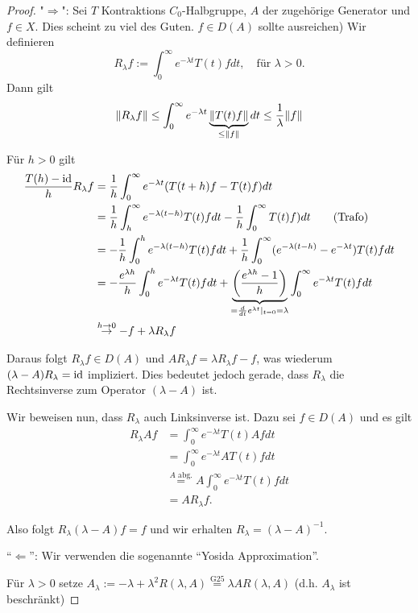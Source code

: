 \begin{proof}
"$\Rightarrow$": 
Sei $T$ Kontraktions $C_0$-Halbgruppe, $A$ der zugehörige Generator und $f \in X$. {\tiny{Dies scheint zu viel des Guten. $f \in D(A)$ sollte ausreichen)}}
Wir definieren
$$R_\lambda f := \int_0^\infty e^{-\lambda t} T(t) f dt, \quad\text{für } \lambda > 0.$$
Dann gilt
$$
\lVert R_\lambda f \rVert 
\leq \int_0^\infty e^{-\lambda t} \underbrace{\lVert T(t) f \rVert}_{\leq \lVert f \rVert} dt 
\leq \frac{1}{\lambda} \lVert f \rVert
$$

Für $h > 0$ gilt
\begin{align*}
\frac{T(h) - \operatorname{id}}{h} R_\lambda f 
&= \frac{1}{h} \int_0^\infty e^{-\lambda t} (T (t + h) f - T(t) f) dt \\
&= \frac{1}{h} \int_h^\infty e^{-\lambda (t - h)} T(t)f dt - \frac{1}{h}\int_0^\infty T(t) f) dt \tag{Trafo}\\
&= -\frac{1}{h}\int_0^h e^{-\lambda(t - h)} T(t) f dt + \frac{1}{h} \int_0^\infty (e^{-\lambda(t - h)} - e^{-\lambda t}) T(t) f dt \\
&= -\frac{e^{\lambda h}}{h} \int_0^h e^{-\lambda t} T(t) fdt + \underbrace{\left(\frac{e^{\lambda h} - 1}{h}\right)}_{= \frac{d}{dt} e^{\lambda t}|_{t = 0} = \lambda} \int_0^\infty e^{-\lambda t} T(t) f dt \\
&\overset{h \to 0}{\to } -f + \lambda R_\lambda f
\end{align*}

Daraus folgt $R_\lambda f \in D(A)$ und $A R_\lambda f = \lambda R_\lambda f - f$, was wiederum $(\lambda - A) R_\lambda = \operatorname{id}$ impliziert. Dies bedeutet jedoch gerade, dass $R_\lambda$ die Rechtsinverse zum Operator $(\lambda - A)$ ist.

Wir beweisen nun, dass $R_\lambda$ auch Linksinverse ist. Dazu sei $f \in D(A)$ und es gilt
\begin{align*}
R_\lambda A f 
&= \int_0^\infty e^{-\lambda t} T(t) Af dt \\
&= \int_0^\infty e^{-\lambda t} A T(t) f dt \\
&\overset{A \text{ abg.}}{=} A \int_0^\infty e^{-\lambda t} T(t) f dt  \\
&= A R_\lambda f.
\end{align*}

Also folgt $R_\lambda(\lambda - A) f = f$ und wir erhalten $R_\lambda = (\lambda - A)^{-1}$.

``$\Leftarrow$'': Wir verwenden die sogenannte ``Yosida Approximation''.

Für $\lambda > 0$ setze $A_\lambda := -\lambda + \lambda^2 R(\lambda, A) \overset{\text{G25}}{=} \lambda AR(\lambda, A)$ (d.h. $A_\lambda$ ist beschränkt)


\end{proof}
